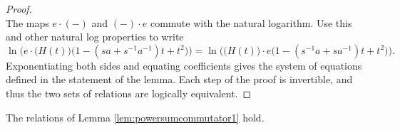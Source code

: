\begin{proof}
\begin{equation}
\end{equation}
The maps $e \cdot (-)$ and $(-) \cdot e$ commute with the natural logarithm. Use this and other natural log properties to write
\begin{equation}
\ln\Big( e \cdot \big( H(t) \big) \big( 1 - (sa + s^{-1}a^{-1})t + t^2 \big) \Big) = \ln\Big( \big( H(t) \big) \cdot e \big( 1 - (s^{-1}a + sa^{-1})t + t^2 \big) \Big).
\end{equation}
Exponentiating both sides and equating coefficients gives the system of equations defined in the statement of the lemma. Each step of the proof is invertible, and thus the two sets of relations are logically equivalent.
\end{proof}

\begin{lemma}
The relations of Lemma \ref{lem:powersumcommutator1} hold.
\end{lemma}
